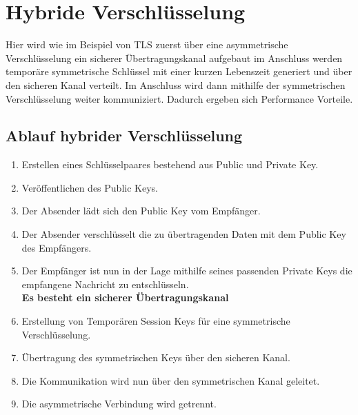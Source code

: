 
\chapter{Hybride Verschlüsselung} %



Hier wird wie im Beispiel von TLS zuerst über eine asymmetrische Verschlüsselung ein sicherer Übertragungskanal aufgebaut im Anschluss werden temporäre symmetrische Schlüssel mit einer kurzen Lebenszeit generiert und über den sicheren Kanal verteilt. Im Anschluss wird dann mithilfe der symmetrischen Verschlüsselung weiter kommuniziert. Dadurch ergeben sich Performance Vorteile.

\section{Ablauf hybrider Verschlüsselung}
\begin{enumerate}
    \item Erstellen eines Schlüsselpaares bestehend aus Public und Private Key.
    \item Veröffentlichen des Public Keys.
    \item Der Absender lädt sich den Public Key vom Empfänger.
    \item Der Absender verschlüsselt die zu übertragenden Daten mit dem Public Key des Empfängers.
    \item Der Empfänger ist nun in der Lage mithilfe seines passenden Private Keys die empfangene Nachricht zu entschlüsseln.
    \\\textbf{Es besteht ein sicherer Übertragungskanal}
    \item Erstellung von Temporären Session Keys für eine symmetrische Verschlüsselung.
    \item Übertragung des symmetrischen Keys über den sicheren Kanal.
    \item Die Kommunikation wird nun über den symmetrischen Kanal geleitet.
    \item Die asymmetrische Verbindung wird getrennt.
\end{enumerate}